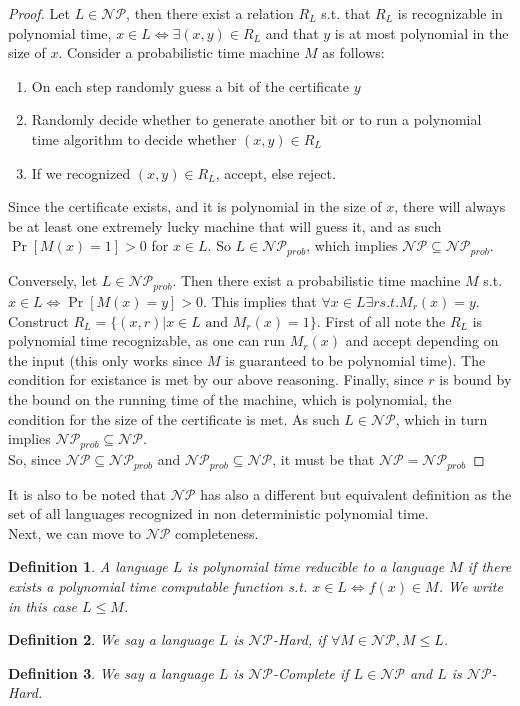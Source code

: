 \documentclass{article}
\newtheorem{definition}{Definition}
\begin{document}
\begin{proof}
Let $L \in \mathcal{NP}$, then there exist a relation $R_L$ s.t. that $R_L$ is recognizable in polynomial time, $x \in L \iff \exists (x, y) \in R_L$ and that $y$ is at most polynomial in the size of $x$. Consider a probabilistic time machine $M$ as follows: 
\begin{enumerate}
    \item On each step randomly guess a bit of the certificate $y$
    \item Randomly decide whether to generate another bit or to run a polynomial time algorithm to decide whether $(x, y) \in R_L$
    \item If we recognized $(x, y) \in R_L$, accept, else reject. 
\end{enumerate}

Since the certificate exists, and it is polynomial in the size of $x$, there will always be at least one extremely lucky machine that will guess it, and as such $\Pr[M(x) = 1] > 0$ for $x \in L$. So $L \in \mathcal{NP}_{prob}$, which implies $\mathcal{NP} \subseteq \mathcal{NP}_{prob}$. 

Conversely, let $L \in \mathcal{NP}_{prob}$. Then there exist a probabilistic time machine $M$ s.t. $x \in L \iff \Pr[M(x) = y] > 0$. This implies that $\forall x \in L\exists r s.t. M_r(x) = y$. Construct $R_L = \{ (x, r) | x \in L \text { and } M_r(x) = 1 \}$. First of all note the $R_L$ is polynomial time recognizable, as one can run $M_r(x)$ and accept depending on the input (this only works since $M$ is guaranteed to be polynomial time). The condition for existance is met by our above reasoning. Finally, since $r$ is bound by the bound on the running time of the machine, which is polynomial, the condition for the size of the certificate is met. As such $L \in \mathcal{NP}$, which in turn implies $\mathcal{NP}_{prob} \subseteq \mathcal{NP}$. \\

So, since $\mathcal{NP} \subseteq \mathcal{NP}_{prob}$ and $\mathcal{NP}_{prob} \subseteq \mathcal{NP}$, it must be that $\mathcal{NP} = \mathcal{NP}_{prob}$


\end{proof}

It is also to be noted that $\mathcal{NP}$ has also a different but equivalent definition as the set of all languages recognized in non deterministic polynomial time. \\

Next, we can move to $\mathcal{NP}$ completeness. 
\begin{definition}
A language $L$ is polynomial time reducible to a language $M$ if there exists a polynomial time computable function s.t. $x \in L \iff f(x) \in M$. We write in this case $L \leq M$.
\end{definition}
\begin{definition}
We say a language $L$ is $\mathcal{NP}$-Hard, if $\forall M \in \mathcal{NP}, M \leq L$.
\end{definition}
\begin{definition}
We say a language $L$ is $\mathcal{NP}$-Complete if $L \in \mathcal{NP}$ and $L$ is $\mathcal{NP}$-Hard.
\end{definition}
\end{document}
